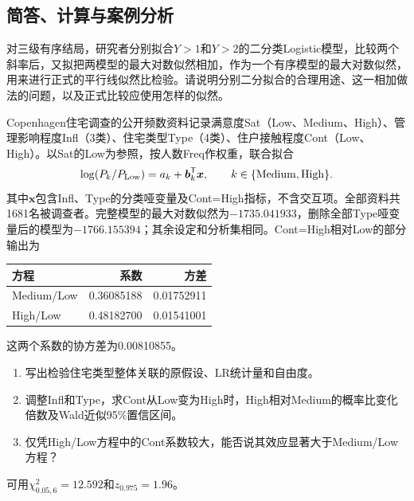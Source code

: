 \subsection{简答、计算与案例分析}

对三级有序结局，研究者分别拟合$Y>1$和$Y>2$的二分类Logistic模型，比较两个斜率后，又拟把两模型的最大对数似然相加，作为一个有序模型的最大对数似然，用来进行正式的平行线似然比检验。请说明分别二分拟合的合理用途、这一相加做法的问题，以及正式比较应使用怎样的似然。

Copenhagen住宅调查的公开频数资料记录满意度Sat（Low、Medium、High）、管理影响程度Infl（3类）、住宅类型Type（4类）、住户接触程度Cont（Low、High）。以Sat的Low为参照，按人数Freq作权重，联合拟合\[\log(P_k/P_{\rm Low})=a_k+\boldsymbol b_k^{\mathsf T}\boldsymbol x,\qquad k\in\{\mathrm{Medium,High}\}.\]其中$\boldsymbol x$包含Infl、Type的分类哑变量及Cont=High指标，不含交互项。全部资料共1681名被调查者。完整模型的最大对数似然为$-1735.041933$，删除全部Type哑变量后的模型为$-1766.155394$；其余设定和分析集相同。Cont=High相对Low的部分输出为\begin{center}\begin{tabular}{lrr}\toprule 方程&系数&方差\\\midrule Medium/Low&0.36085188&0.01752911\\High/Low&0.48182700&0.01541001\\\bottomrule \end{tabular}\end{center}这两个系数的协方差为0.00810855。\begin{enumerate}\item 写出检验住宅类型整体关联的原假设、LR统计量和自由度。\item 调整Infl和Type，求Cont从Low变为High时，High相对Medium的概率比变化倍数及Wald近似95\%置信区间。\item 仅凭High/Low方程中的Cont系数较大，能否说其效应显著大于Medium/Low方程？\end{enumerate}可用$\chi^2_{0.05,6}=12.592$和$z_{0.975}=1.96$。

